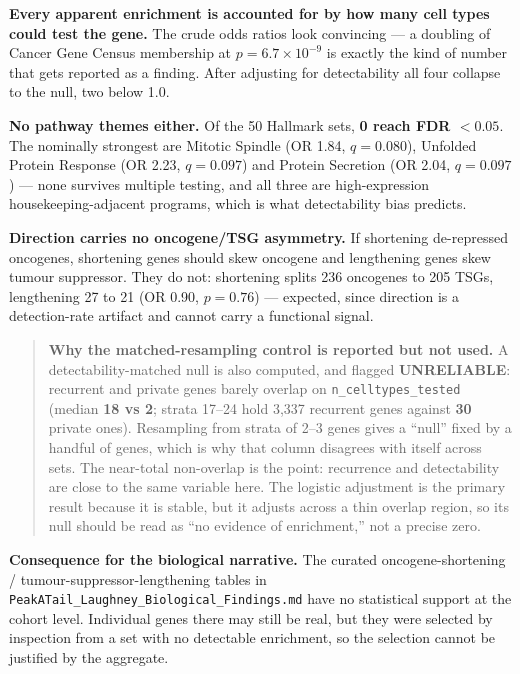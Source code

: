 \documentclass[11pt,a4paper]{article}
\begin{document}
\textbf{Every apparent enrichment is accounted for by how many cell types could
test the gene.} The crude odds ratios look convincing --- a doubling of Cancer Gene
Census membership at $p = 6.7\times10^{-9}$ is exactly the kind of number that gets
reported as a finding. After adjusting for detectability all four collapse to the
null, two below 1.0.

\textbf{No pathway themes either.} Of the 50 Hallmark sets, \textbf{0 reach
FDR $< 0.05$}. The nominally strongest are Mitotic Spindle (OR 1.84, $q = 0.080$),
Unfolded Protein Response (OR 2.23, $q = 0.097$) and Protein Secretion (OR 2.04,
$q = 0.097$) --- none survives multiple testing, and all three are high-expression
housekeeping-adjacent programs, which is what detectability bias predicts.

\textbf{Direction carries no oncogene/TSG asymmetry.} If shortening de-repressed
oncogenes, shortening genes should skew oncogene and lengthening genes skew tumour
suppressor. They do not: shortening splits 236 oncogenes to 205 TSGs, lengthening
27 to 21 (OR 0.90, $p = 0.76$) --- expected, since direction is a detection-rate
artifact and cannot carry a functional signal.

\begin{quote}
\textbf{Why the matched-resampling control is reported but not used.} A
detectability-matched null is also computed, and flagged \textbf{UNRELIABLE}:
recurrent and private genes barely overlap on \texttt{n\_celltypes\_tested}
(median \textbf{18 vs 2}; strata 17--24 hold 3,337 recurrent genes against
\textbf{30} private ones). Resampling from strata of 2--3 genes gives a ``null''
fixed by a handful of genes, which is why that column disagrees with itself across
sets. The near-total non-overlap is the point: recurrence and detectability are
close to the same variable here. The logistic adjustment is the primary result
because it is stable, but it adjusts across a thin overlap region, so its null
should be read as ``no evidence of enrichment,'' not a precise zero.
\end{quote}

\textbf{Consequence for the biological narrative.} The curated
oncogene-shortening / tumour-suppressor-lengthening tables in
\texttt{PeakATail\_Laughney\_Biological\_Findings.md} have no statistical support
at the cohort level. Individual genes there may still be real, but they were
selected by inspection from a set with no detectable enrichment, so the selection
cannot be justified by the aggregate.
\end{document}

